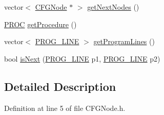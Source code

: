 \begin{DoxyCompactItemize}
vector$<$ \hyperlink{class_c_f_g_node}{C\-F\-G\-Node} $\ast$ $>$ \hyperlink{class_c_f_g_node_aa25f0bc77360bee32f0e4393f7d612a8}{get\-Next\-Nodes} ()
\item 
\hyperlink{std_afx_8h_aa07ea1d188c7b45668f1bd82ffd6d87e}{P\-R\-O\-C} \hyperlink{class_c_f_g_node_a2c9700b808aad05029293f0d1cd13b01}{get\-Procedure} ()
\item 
vector$<$ \hyperlink{std_afx_8h_abcc2d0120d16c2587a85b314010f6399}{P\-R\-O\-G\-\_\-\-L\-I\-N\-E} $>$ \hyperlink{class_c_f_g_node_a00d7decf2f7e7068accae7b2e59f4a7a}{get\-Program\-Lines} ()
\item 
bool \hyperlink{class_c_f_g_node_aa0b5bc3202db67e6834fb82fc7c059cf}{is\-Next} (\hyperlink{std_afx_8h_abcc2d0120d16c2587a85b314010f6399}{P\-R\-O\-G\-\_\-\-L\-I\-N\-E} p1, \hyperlink{std_afx_8h_abcc2d0120d16c2587a85b314010f6399}{P\-R\-O\-G\-\_\-\-L\-I\-N\-E} p2)
\end{DoxyCompactItemize}


\subsection{Detailed Description}


Definition at line 5 of file C\-F\-G\-Node.\-h.



